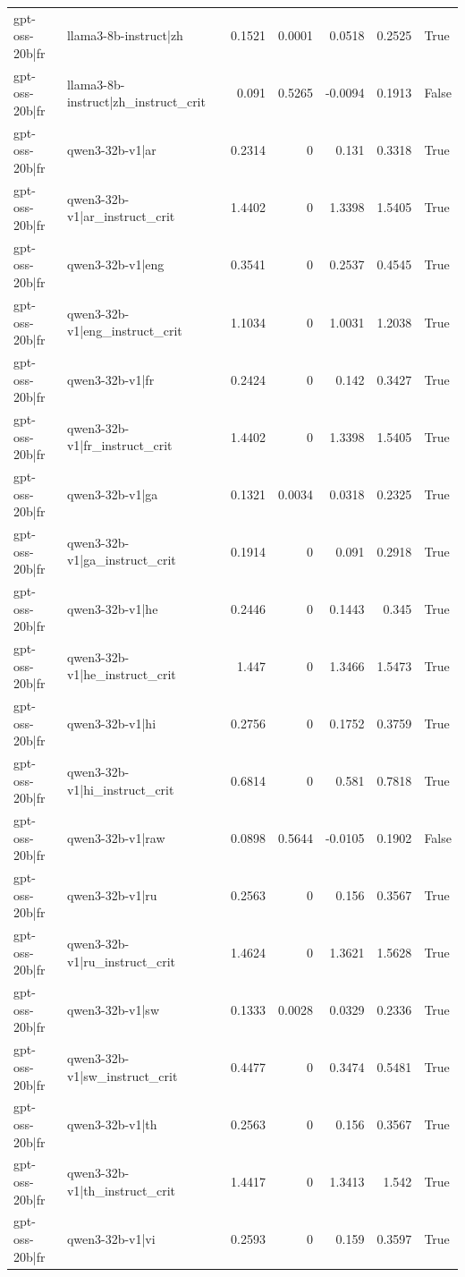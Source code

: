 \begin{table}
\begin{tabular}{l l r r r r l}
gpt-oss-20b|fr & llama3-8b-instruct|zh & 0.1521 & 0.0001 & 0.0518 & 0.2525 & True \\
gpt-oss-20b|fr & llama3-8b-instruct|zh_instruct_crit & 0.091 & 0.5265 & -0.0094 & 0.1913 & False \\
gpt-oss-20b|fr & qwen3-32b-v1|ar & 0.2314 & 0 & 0.131 & 0.3318 & True \\
gpt-oss-20b|fr & qwen3-32b-v1|ar_instruct_crit & 1.4402 & 0 & 1.3398 & 1.5405 & True \\
gpt-oss-20b|fr & qwen3-32b-v1|eng & 0.3541 & 0 & 0.2537 & 0.4545 & True \\
gpt-oss-20b|fr & qwen3-32b-v1|eng_instruct_crit & 1.1034 & 0 & 1.0031 & 1.2038 & True \\
gpt-oss-20b|fr & qwen3-32b-v1|fr & 0.2424 & 0 & 0.142 & 0.3427 & True \\
gpt-oss-20b|fr & qwen3-32b-v1|fr_instruct_crit & 1.4402 & 0 & 1.3398 & 1.5405 & True \\
gpt-oss-20b|fr & qwen3-32b-v1|ga & 0.1321 & 0.0034 & 0.0318 & 0.2325 & True \\
gpt-oss-20b|fr & qwen3-32b-v1|ga_instruct_crit & 0.1914 & 0 & 0.091 & 0.2918 & True \\
gpt-oss-20b|fr & qwen3-32b-v1|he & 0.2446 & 0 & 0.1443 & 0.345 & True \\
gpt-oss-20b|fr & qwen3-32b-v1|he_instruct_crit & 1.447 & 0 & 1.3466 & 1.5473 & True \\
gpt-oss-20b|fr & qwen3-32b-v1|hi & 0.2756 & 0 & 0.1752 & 0.3759 & True \\
gpt-oss-20b|fr & qwen3-32b-v1|hi_instruct_crit & 0.6814 & 0 & 0.581 & 0.7818 & True \\
gpt-oss-20b|fr & qwen3-32b-v1|raw & 0.0898 & 0.5644 & -0.0105 & 0.1902 & False \\
gpt-oss-20b|fr & qwen3-32b-v1|ru & 0.2563 & 0 & 0.156 & 0.3567 & True \\
gpt-oss-20b|fr & qwen3-32b-v1|ru_instruct_crit & 1.4624 & 0 & 1.3621 & 1.5628 & True \\
gpt-oss-20b|fr & qwen3-32b-v1|sw & 0.1333 & 0.0028 & 0.0329 & 0.2336 & True \\
gpt-oss-20b|fr & qwen3-32b-v1|sw_instruct_crit & 0.4477 & 0 & 0.3474 & 0.5481 & True \\
gpt-oss-20b|fr & qwen3-32b-v1|th & 0.2563 & 0 & 0.156 & 0.3567 & True \\
gpt-oss-20b|fr & qwen3-32b-v1|th_instruct_crit & 1.4417 & 0 & 1.3413 & 1.542 & True \\
gpt-oss-20b|fr & qwen3-32b-v1|vi & 0.2593 & 0 & 0.159 & 0.3597 & True \\

\end{tabular}
\end{table}
